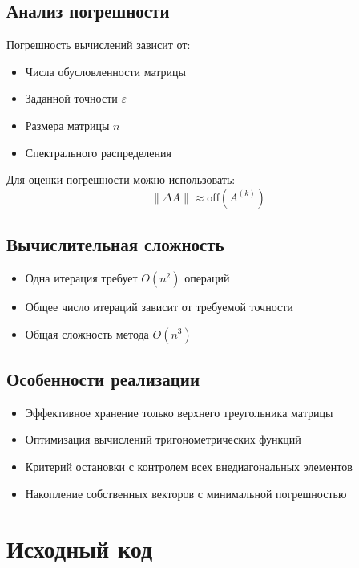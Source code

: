 \subsection*{Анализ погрешности}
Погрешность вычислений зависит от:
\begin{itemize}
\item Числа обусловленности матрицы
\item Заданной точности $\varepsilon$
\item Размера матрицы $n$
\item Спектрального распределения
\end{itemize}

Для оценки погрешности можно использовать:
\begin{equation}
\|\Delta A\| \approx \mathrm{off}(A^{(k)})
\end{equation}

\subsection*{Вычислительная сложность}
\begin{itemize}
\item Одна итерация требует $O(n^2)$ операций
\item Общее число итераций зависит от требуемой точности
\item Общая сложность метода $O(n^3)$
\end{itemize}

\subsection*{Особенности реализации}
\begin{itemize}
\item Эффективное хранение только верхнего треугольника матрицы
\item Оптимизация вычислений тригонометрических функций
\item Критерий остановки с контролем всех внедиагональных элементов
\item Накопление собственных векторов с минимальной погрешностью
\end{itemize}

\section*{Исходный код}

